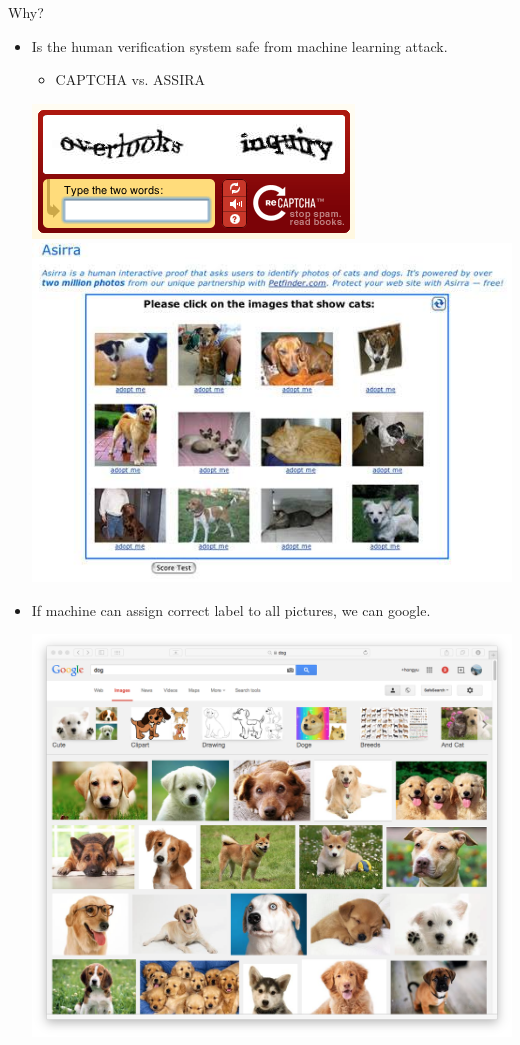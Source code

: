 \documentclass[first=dgreen,second=purple,logo=yellowexc]{aaltoslides}
\begin{document}
{\begin{frame}{Why?}
	\begin{itemize}
		\item Is the human verification system safe from machine learning attack.
		\begin{itemize}
			\footnotesize
			\item CAPTCHA vs. ASSIRA
		\end{itemize}
		\begin{center}
			\includegraphics[scale=0.2]{./figures/captcha.png}
			\text{     }
			\includegraphics[scale=0.2]{./figures/assira.jpg}
		\end{center}
		\item If machine can assign correct label to all pictures, we can google.
		\begin{center}
			\includegraphics[scale=0.2]{./figures/googledog.png}

\end{center}
\end{itemize}
\end{frame}}
\end{document}
